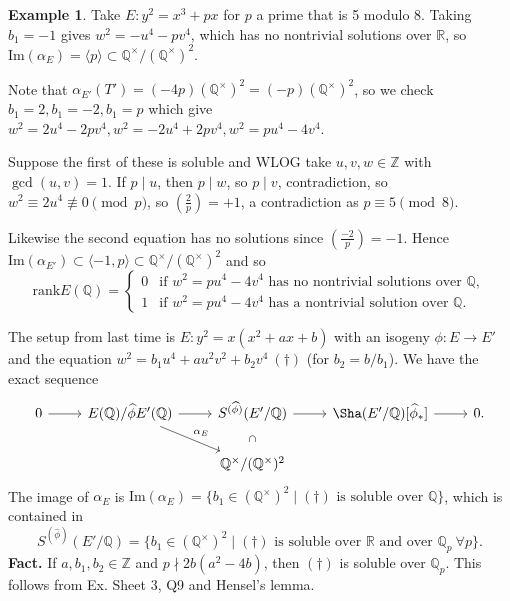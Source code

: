 \documentclass{article}
\theoremstyle{definition}
\newtheorem{example}{Example}[section]
\begin{document}
\begin{example}\label{example16.2}
    Take $E: y^2=x^3+px$ for $p$ a prime that is 5 modulo 8. Taking $b_1=-1$ gives $w^2 = -u^4-pv^4$, which has no nontrivial solutions over $\mathbb{R}$, so $\text{Im}(\alpha_{E}) = \langle p \rangle \subset \mathbb{Q}^\times/(\mathbb{Q}^\times)^2$.
    \vspace{1mm}
     
    Note that $\alpha_{E'}(T') = (-4p)(\mathbb{Q}^\times)^2 = (-p)(\mathbb{Q}^\times)^2$, so we check $b_1=2,b_1=-2,b_1=p$ which give $w^2 = 2u^4-2pv^4, w^2 = -2u^4 + 2pv^4, w^2=pu^4-4v^4$. 
    \vspace{1mm}
     
    Suppose the first of these is soluble and WLOG take $u,v,w \in \mathbb{Z}$ with $\gcd(u,v)=1$. If $p \mid u$, then $p \mid w$, so $p \mid v$, contradiction, so $w^2 \equiv 2u^4 \not\equiv 0 \pmod{p}$, so $\left(\frac{2}{p}\right) = +1$, a contradiction as $p \equiv 5 \pmod{8}$.
    \vspace{1mm}
     
    Likewise the second equation has no solutions since $\left(\frac{-2}{p}\right) = -1$. Hence $\text{Im}(\alpha_{E'}) \subset \langle -1,p \rangle \subset \mathbb{Q}^\times/(\mathbb{Q}^\times)^2$ and so 
    \[
    \text{rank}E(\mathbb{Q}) = \begin{cases}
        0 &\text{if } w^2=pu^4-4v^4 \text{ has no nontrivial solutions over }\mathbb{Q},\\
        1 &\text{if } w^2=pu^4-4v^4 \text{ has a nontrivial solution over }\mathbb{Q}.
    \end{cases}
    \]
\end{example}
The setup from last time is $E:y^2=x(x^2+ax+b)$ with an isogeny $\phi : E \to E'$ and the equation $w^2=b_1u^4+au^2v^2+b_2v^4~ (\dagger)$ (for $b_2 = b/b_1$). We have the exact sequence
\[
\begin{tikzcd}
    0 \arrow{r} & E(\mathbb{Q})/\widehat{\phi}E'(\mathbb{Q})\arrow{r}\arrow{dr}{\alpha_E} & S^{(\widehat{\phi})}(E'/\mathbb{Q}) \arrow{r} \arrow[draw=none]{d}[sloped,auto=false, rotate=0]{\subset}& \Sha(E'/\mathbb{Q})[\widehat{\phi}_*] \arrow{r} & 0. \\
    & & \mathbb{Q}^\times/(\mathbb{Q}^\times)^2
\end{tikzcd}
\]
The image of $\alpha_E$ is $\text{Im}(\alpha_E) = \{b_1 \in (\mathbb{Q}^\times)^2 \mid (\dagger) \text{ is soluble over }\mathbb{Q}\}$, which is contained in \[
S^{(\widehat{\phi})}(E'/\mathbb{Q}) = \{b_1 \in (\mathbb{Q}^\times)^2 \mid (\dagger) \text{ is soluble over }\mathbb{R} \text{ and over }\mathbb{Q}_p ~\forall p\}.
\]
\textbf{Fact.} If $a,b_1,b_2 \in \mathbb{Z}$ and $p \nmid 2b(a^2-4b)$, then $(\dagger)$ is soluble over $\mathbb{Q}_p$. This follows from Ex. Sheet 3, Q9 and Hensel's lemma.
\vspace{1mm}
 
\end{document}
